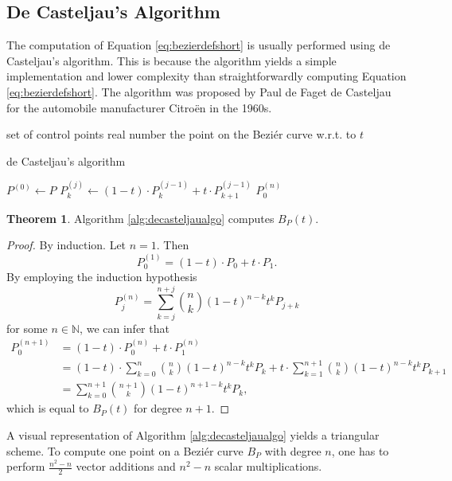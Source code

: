 \documentclass[a4paper, 11pt]{report}
\theoremstyle{definition}
\newtheorem{theorem}[definition]{Theorem}
\newcommand{\Desc}[2]{\State \makebox[12em][l]{#1}#2}
\begin{document}
\subsection{De Casteljau's Algorithm}

The computation of Equation \ref{eq:bezierdefshort} is usually performed using de Casteljau's algorithm. This is because the algorithm yields a simple implementation and lower complexity than straightforwardly computing Equation \ref{eq:bezierdefshort}. The algorithm was proposed by Paul de Faget de Casteljau for the automobile manufacturer Citroën in the 1960s.

\begin{algorithm}[H]
	\begin{algorithmic}[1]
		\Input
			\Desc{$P = \{P_0, P_1, ..., P_n\}$}{set of control points}
			\Desc{$t$}{real number}
		\EndInput
		\Output
			\Desc{$P^{(n)}_0 = B_P(t)$}{the point on the Beziér curve w.r.t. to $t$}
		\EndOutput

		\caption{de Casteljau's algorithm}\label{alg:decasteljaualgo}
			\State $P^{(0)} \gets P$
					\State $P^{(j)}_k \gets (1-t) \cdot P^{(j-1)}_k + t \cdot P^{(j-1)}_{k+1}$
				\EndFor
			\EndFor
			\Return $P^{(n)}_0$
		\EndProcedure
	\end{algorithmic}
\end{algorithm}

\begin{theorem}
	Algorithm \ref{alg:decasteljaualgo} computes $B_P(t)$.
\end{theorem}
\begin{proof}
	By induction. Let $n = 1$. Then
		$$ P_0^{(1)} = (1-t) \cdot P_0 + t \cdot P_1.$$
	By employing the induction hypothesis
		$$ P_j^{(n)} = \sum_{k=j}^{n+j} \binom{n}{k} (1-t)^{n-k}t^k P_{j+k}$$
	for some $n \in \mathbb{N}$, we can infer that
	\begin{align*}
		P_0^{(n+1)}	&= (1-t) \cdot P_0^{(n)} + t \cdot P_1^{(n)} \\
					&= (1-t) \cdot \sum_{k=0}^{n} \binom{n}{k} (1-t)^{n-k}t^k P_{k} + t \cdot \sum_{k=1}^{n+1} \binom{n}{k} (1-t)^{n-k}t^k P_{k+1} \\
					&= \sum_{k=0}^{n+1} \binom{n+1}{k} (1-t)^{n+1-k}t^k P_{k},
	\end{align*}
	which is equal to $B_P(t)$ for degree $n+1$.
\end{proof}

A visual representation of Algorithm \ref{alg:decasteljaualgo} yields a triangular scheme. To compute one point on a Beziér curve $B_P$ with degree $n$, one has to perform $\frac{n^2-n}{2}$ vector additions and $n^2-n$ scalar multiplications.
\end{document}
